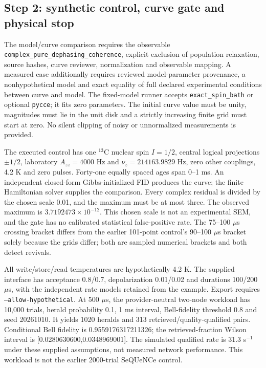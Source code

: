 \documentclass[10pt,a4paper]{article}
\newcommand{\code}[1]{\texttt{#1}}
\begin{document}
\subsection{Step 2: synthetic control, curve gate and physical stop}
The model/curve comparison requires the observable \code{complex\_pure\_dephasing\_coherence}, explicit exclusion of population relaxation, source hashes, curve reviewer, normalization and observable mapping. A measured case additionally requires reviewed model-parameter provenance, a nonhypothetical model and exact equality of full declared experimental conditions between curve and model. The fixed-model runner accepts \code{exact\_spin\_bath} or optional \code{pycce}; it fits zero parameters. The initial curve value must be unity, magnitudes must lie in the unit disk and a strictly increasing finite grid must start at zero. No silent clipping of noisy or unnormalized measurements is provided.

The executed control has one $^{13}$C nuclear spin $I=1/2$, central logical projections $\pm1/2$, laboratory $A_{zz}=4000$ Hz and $\nu_z=214163.9829$ Hz, zero other couplings, 4.2 K and zero pulses. Forty-one equally spaced ages span 0--1 ms. An independent closed-form Gibbs-initialized FID produces the curve; the finite Hamiltonian solver supplies the comparison. Every complex residual is divided by the chosen scale 0.01, and the maximum must be at most three. The observed maximum is $3.7192473\times10^{-12}$. This chosen scale is not an experimental SEM, and the gate has no calibrated statistical false-positive rate. The 75--100 $\mu$s crossing bracket differs from the earlier 101-point control's 90--100 $\mu$s bracket solely because the grids differ; both are sampled numerical brackets and both detect revivals.

All write/store/read temperatures are hypothetically 4.2 K. The supplied interface has acceptance 0.8/0.7, depolarization 0.01/0.02 and durations 100/200 $\mu$s, with the independent rate models retained from the example. Export requires \code{--allow-hypothetical}. At 500 $\mu$s, the provider-neutral two-node workload has 10,000 trials, herald probability 0.1, 1 ms interval, Bell-fidelity threshold 0.8 and seed 20261010. It yields 1020 heralds and 313 retrieved/quality-qualified pairs. Conditional Bell fidelity is 0.9559176317211326; the retrieved-fraction Wilson interval is [0.0280630600,0.0348969001]. The simulated qualified rate is 31.3 s$^{-1}$ under these supplied assumptions, not measured network performance. This workload is not the earlier 2000-trial SeQUeNCe control.
\end{document}
